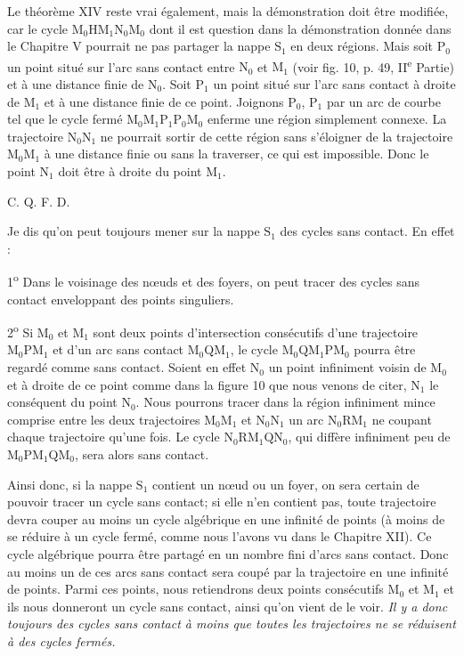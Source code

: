 \documentclass[11pt]{article}
\begin{document}
Le théorème XIV reste vrai également, mais la démonstration doit être modifiée, car le cycle $\mathrm{M}_0\mathrm{H}\mathrm{M}_1\mathrm{N}_0\mathrm{M}_0$ dont il est question dans la démonstration donnée dans le Chapitre V pourrait ne pas partager la nappe $\mathrm{S}_1$ en deux régions. Mais soit $\mathrm{P}_0$ un point situé sur l’arc sans contact entre $\mathrm{N}_0$ et $\mathrm{M}_1$ (voir fig. 10, p. 49, II\textsuperscript{e} Partie) et à une distance finie de $\mathrm{N}_0$. Soit $\mathrm{P}_1$ un point situé sur l’arc sans contact à droite de $\mathrm{M}_1$ et à une distance finie de ce point. Joignons $\mathrm{P}_0$, $\mathrm{P}_1$ par un arc de courbe tel que le cycle fermé $\mathrm{M}_0\mathrm{M}_1\mathrm{P}_1\mathrm{P}_0\mathrm{M}_0$ enferme une région simplement connexe. La trajectoire $\mathrm{N}_0\mathrm{N}_1$ ne pourrait sortir de cette région sans s’éloigner de la trajectoire $\mathrm{M}_0\mathrm{M}_1$ à une distance finie ou sans la traverser, ce qui est impossible. Donc le point $\mathrm{N}_1$ doit être à droite du point $\mathrm{M}_1$.
\begin{flushright}C. Q. F. D.\end{flushright}

Je dis qu’on peut toujours mener sur la nappe $\mathrm{S}_1$ des cycles sans contact. En effet :

1\textsuperscript{o} Dans le voisinage des nœuds et des foyers, on peut tracer des cycles sans contact enveloppant des points singuliers.

2\textsuperscript{o} Si $\mathrm{M}_0$ et $\mathrm{M}_1$ sont deux points d’intersection consécutifs d’une trajectoire $\mathrm{M}_0\mathrm{P}\mathrm{M}_1$ et d’un arc sans contact $\mathrm{M}_0\mathrm{Q}\mathrm{M}_1$, le cycle $\mathrm{M}_0\mathrm{Q}\mathrm{M}_1\mathrm{P}\mathrm{M}_0$ pourra être regardé comme sans contact. Soient en effet $\mathrm{N}_0$ un point infiniment voisin de $\mathrm{M}_0$ et à droite de ce point comme dans la figure 10 que nous venons de citer, $\mathrm{N}_1$ le conséquent du point $\mathrm{N}_0$. Nous pourrons tracer dans la région infiniment mince comprise entre les deux trajectoires $\mathrm{M}_0\mathrm{M}_1$ et $\mathrm{N}_0\mathrm{N}_1$ un arc $\mathrm{N}_0\mathrm{R}\mathrm{M}_1$ ne coupant chaque trajectoire qu’une fois. Le cycle $\mathrm{N}_0\mathrm{R}\mathrm{M}_1\mathrm{Q}\mathrm{N}_0$, qui diffère infiniment peu de $\mathrm{M}_0\mathrm{P}\mathrm{M}_1\mathrm{Q}\mathrm{M}_0$, sera alors sans contact.

Ainsi donc, si la nappe $\mathrm{S}_1$ contient un nœud ou un foyer, on sera certain de pouvoir tracer un cycle sans contact; si elle n’en contient pas, toute trajectoire devra couper au moins un cycle algébrique en une infinité de points (à moins de se réduire à un cycle fermé, comme nous l’avons vu dans le Chapitre XII). Ce cycle algébrique pourra être partagé en un nombre fini d’arcs sans contact. Donc au moins un de ces arcs sans contact sera coupé par la trajectoire en une infinité de points. Parmi ces points, nous retiendrons deux points consécutifs $\mathrm{M}_0$ et $\mathrm{M}_1$ et ils nous donneront un cycle sans contact, ainsi qu’on vient de le voir. \emph{Il y a donc toujours des cycles sans contact à moins que toutes les trajectoires ne se réduisent à des cycles fermés.}
\end{document}
